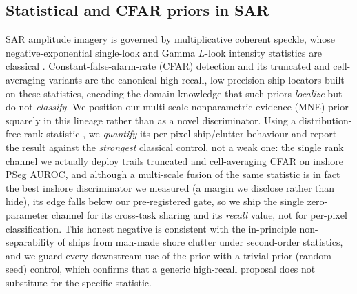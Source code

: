 \documentclass[journal]{IEEEtran}
\begin{document}
\subsection{Statistical and CFAR priors in SAR}
SAR amplitude imagery is governed by multiplicative coherent speckle, whose negative-exponential single-look and Gamma $L$-look intensity statistics are classical \cite{goodman1976speckle,oliver2004sar}. Constant-false-alarm-rate (CFAR) detection \cite{finn1968cfar} and its truncated and cell-averaging variants are the canonical high-recall, low-precision ship locators built on these statistics, encoding the domain knowledge that such priors \emph{localize} but do not \emph{classify}. We position our multi-scale nonparametric evidence (MNE) prior squarely in this lineage rather than as a novel discriminator. Using a distribution-free rank statistic \cite{mann1947whitney}, we \emph{quantify} its per-pixel ship/clutter behaviour and report the result against the \emph{strongest} classical control, not a weak one: the single rank channel we actually deploy trails truncated and cell-averaging CFAR on inshore PSeg AUROC, and although a multi-scale fusion of the same statistic is in fact the best inshore discriminator we measured (a margin we disclose rather than hide), its edge falls below our pre-registered gate, so we ship the single zero-parameter channel for its cross-task sharing and its \emph{recall} value, not for per-pixel classification. This honest negative is consistent with the in-principle non-separability of ships from man-made shore clutter under second-order statistics, and we guard every downstream use of the prior with a trivial-prior (random-seed) control, which confirms that a generic high-recall proposal does not substitute for the specific statistic.
\end{document}
